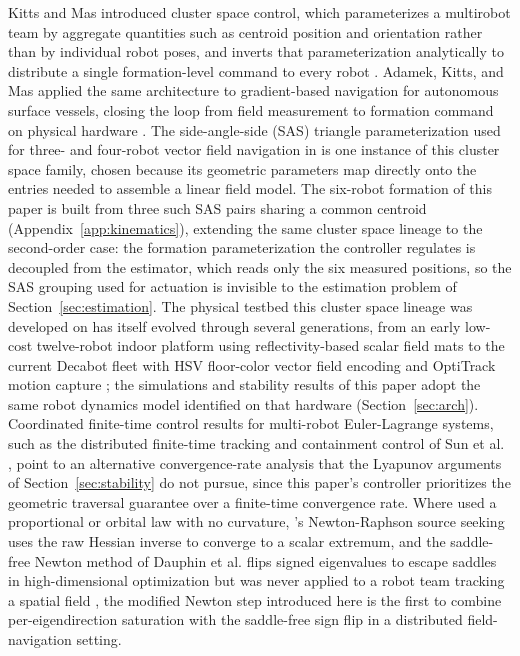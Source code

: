 \documentclass[lettersize,journal]{IEEEtran}
\begin{document}
Kitts and Mas introduced cluster space control, which parameterizes a
multirobot team by aggregate quantities such as centroid position and
orientation rather than by individual robot poses, and inverts that
parameterization analytically to distribute a single formation-level
command to every robot \cite{30}. Adamek, Kitts, and Mas applied the same
architecture to gradient-based navigation for autonomous surface vessels,
closing the loop from field measurement to formation command on physical
hardware \cite{31}. The side-angle-side (SAS) triangle parameterization used for
three- and four-robot vector field navigation in \cite{14} is one instance of
this cluster space family, chosen because its geometric parameters map
directly onto the entries needed to assemble a linear field model. The
six-robot formation of this paper is built from three such SAS pairs
sharing a common centroid (Appendix~\ref{app:kinematics}), extending the
same cluster space lineage to the second-order case: the formation
parameterization the controller regulates is decoupled from the estimator,
which reads only the six measured positions, so the SAS grouping used for
actuation is invisible to the estimation problem of
Section~\ref{sec:estimation}. The physical testbed this cluster space
lineage was developed on has itself evolved through several
generations, from an early low-cost twelve-robot indoor platform using
reflectivity-based scalar field mats \cite{32} to the current Decabot fleet
with HSV floor-color vector field encoding and OptiTrack motion capture
\cite{33}; the simulations and stability results of this paper adopt the same
robot dynamics model identified on that hardware
(Section~\ref{sec:arch}). Coordinated finite-time control results for
multi-robot Euler-Lagrange systems, such as the distributed
finite-time tracking and containment control of Sun et al. \cite{34}, point
to an alternative convergence-rate analysis that the Lyapunov arguments
of Section~\ref{sec:stability} do not pursue, since this paper's
controller prioritizes the geometric traversal guarantee over a
finite-time convergence rate. Where \cite{14} used a proportional or orbital law
with no curvature, \cite{15}'s Newton-Raphson source seeking uses the raw
Hessian inverse to converge to a scalar extremum, and the saddle-free
Newton method of Dauphin et al. flips signed eigenvalues to escape saddles
in high-dimensional optimization but was never applied to a robot team
tracking a spatial field \cite{35}, the modified Newton step introduced here is
the first to combine per-eigendirection saturation with the saddle-free
sign flip in a distributed field-navigation setting.
\end{document}
